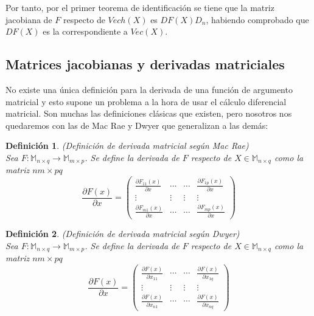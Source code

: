 \documentclass{article}
\theoremstyle{theorem-style}  %
\theoremstyle{definition-style}
\newtheorem{definition}{Definición}[section]
\theoremstyle{example-style}
\theoremstyle{exercise-style}
\begin{document}
	Por tanto, por el primer teorema de identificación se tiene que la matriz jacobiana de $F$ respecto de $Vech(X)$ es $DF(X)D_n$,  habiendo comprobado que $DF(X)$ es la correspondiente a $Vec(X)$. 
	
	
	\subsection{Matrices jacobianas y derivadas matriciales}
	
	No existe una única definición para la derivada de una función de argumento matricial y esto supone un problema a la hora de usar el cálculo diferencial matricial. Son muchas las definiciones clásicas que existen, pero nosotros nos quedaremos con las de Mac Rae y Dwyer que generalizan a las demás:
	
	\begin{definition}
		(Definición de derivada matricial según Mac Rae)\\
		Sea $F:\mathbb{M}_{n\times q}\rightarrow \mathbb{M}_{m\times p}$. Se define la derivada de $F$ respecto de $X\in \mathbb{M}_{n\times q}$ como la matriz $nm\times pq$
		$$ \frac{\partial F(x)}{\partial x} = \left( \begin{array}{cccc}
		\frac{\partial F_{11}(x)}{\partial x} & \cdots & \cdots & \frac{\partial F_{1p}(x)}{\partial x}\\
		\vdots & \vdots & \vdots & \vdots \\
		\frac{\partial F_{m1}(x)}{\partial x} & \cdots & \cdots & \frac{\partial F_{mp}(x)}{\partial x}
		\end{array}\right)$$	
	\end{definition}
	
	\begin{definition}
		(Definición de derivada matricial según Dwyer)\\
		Sea $F:\mathbb{M}_{n\times q}\rightarrow \mathbb{M}_{m\times p}$. Se define la derivada de $F$ respecto de $X\in \mathbb{M}_{n\times q}$ como la matriz $nm\times pq$
		$$ \frac{\partial F(x)}{\partial x} = \left( \begin{array}{cccc}
		\frac{\partial F(x)}{\partial x_{11}} & \cdots & \cdots & \frac{\partial F(x)}{\partial x_{1q}}\\
		\vdots & \vdots & \vdots & \vdots \\
		\frac{\partial F(x)}{\partial x_{n1}} & \cdots & \cdots & \frac{\partial F(x)}{\partial x_{nq}}
		\end{array}\right)$$	
	\end{definition}
	
\end{document}
